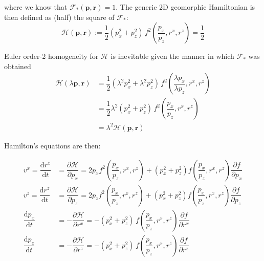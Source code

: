 \documentclass[11pt]{article}
\begin{document}
where we know that \(\mathcal{F}_*(\mathbf{p},\mathbf{r})=1\). The
generic 2D geomorphic Hamiltonian is then defined as (half) the square
of \(\mathcal{F}_*\): \begin{equation}
    \mathcal{H}(\mathbf{p},\mathbf{r})
     := \dfrac{1}{2}\left(p_x^2+p_z^2\right) \, f^2\!\left(\dfrac{p_x}{p_z}, r^x, r^z\right)
     = \dfrac{1}{2}
\end{equation}

Euler order-2 homogeneity for \(\mathcal{H}\) is inevitable given the
manner in which \(\mathcal{F}_*\) was obtained \begin{align}
    \mathcal{H}(\lambda\mathbf{p},\mathbf{r}) 
    &= \dfrac{1}{2}(\lambda^2 p_x^2+\lambda^2 p_z^2) \, f^2\!\left(\dfrac{\lambda p_x}{\lambda p_z}, r^x, r^z\right) \\
    &= \dfrac{1}{2}\lambda^2 (p_x^2+p_z^2) \, f^2\!\left(\dfrac{p_x}{p_z}, r^x, r^z\right) \\
    &= \lambda^2 \mathcal{H}(\mathbf{p},\mathbf{r}) 
\end{align}

Hamilton's equations are then:

\begin{align}
    v^x 
    = \dfrac{\mathrm{d}r^x}{\mathrm{d}t} 
    & = \dfrac{\partial{\mathcal{H}}}{\partial{p_x}}
    = 2 p_x f^2\!\left(\dfrac{p_x}{p_z}, r^x, r^z\right) 
    + \left(p_x^2+p_z^2\right) f\!\left(\dfrac{p_x}{p_z}, r^x, r^z\right) \dfrac{\partial{f}}{\partial{p_x}} \\
    v^z 
    = \dfrac{\mathrm{d}r^z}{\mathrm{d}t} 
    & = \dfrac{\partial{\mathcal{H}}}{\partial{p_z}}
    = 2 p_z f^2\!\left(\dfrac{p_x}{p_z}, r^x, r^z\right) 
    + \left(p_x^2+p_z^2\right) f\!\left(\dfrac{p_x}{p_z}, r^x, r^z\right) \dfrac{\partial{f}}{\partial{p_z}} \\
    \dfrac{\mathrm{d}p_x}{\mathrm{d}t} 
    & 
    = -\dfrac{\partial{\mathcal{H}}}{\partial{r^x}}
    = - \left(p_x^2+p_z^2\right) \, f\!\left(\dfrac{p_x}{p_z}, r^x, r^z\right) \dfrac{\partial{f}}{\partial{r^x}} \\
    \dfrac{\mathrm{d}p_z}{\mathrm{d}t} 
    & 
    = -\dfrac{\partial{\mathcal{H}}}{\partial{r^z}}
    = - \left(p_x^2+p_z^2\right) \, f\!\left(\dfrac{p_x}{p_z}, r^x, r^z\right) \dfrac{\partial{f}}{\partial{r^z}} 
\end{align}


    
    
    
\end{document}
